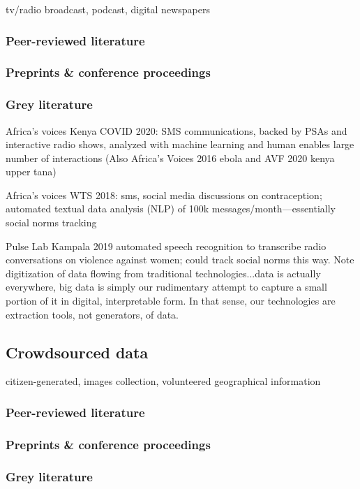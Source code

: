 \documentclass{article}
\begin{document}
tv/radio broadcast, podcast, digital newspapers

\subsubsection{Peer-reviewed literature}
\subsubsection{Preprints \& conference proceedings}

\subsubsection{Grey literature}

Africa's voices Kenya COVID 2020: SMS communications, backed by PSAs and interactive radio shows, analyzed with machine learning and human enables large number of interactions (Also Africa's Voices 2016 ebola and AVF 2020 kenya upper tana)

Africa's voices WTS 2018: sms, social media discussions on contraception; automated textual data analysis (NLP) of 100k messages/month---essentially social norms tracking

Pulse Lab Kampala 2019 automated speech recognition to transcribe radio conversations on violence against women; could track social norms this way. Note digitization of data flowing from traditional technologies...data is actually everywhere, big data is simply our rudimentary attempt to capture a small portion of it in digital, interpretable form. In that sense, our technologies are extraction tools, not generators, of data.

\subsection{Crowdsourced data}
citizen-generated, images collection, volunteered geographical information

\subsubsection{Peer-reviewed literature}
\subsubsection{Preprints \& conference proceedings}

\subsubsection{Grey literature}
\end{document}
